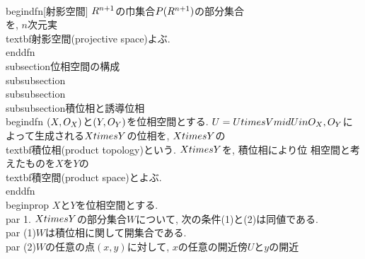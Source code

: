  \\begin{dfn}[射影空間]
 $\\R^{n+1}$の巾集合$P(\\R^{n+1})$の部分集合
 \\[
  \\P^{n}=\\left\\{L\\in P(\\R^{n+1})\\mid L\\text{は}\\R^{n+1}\\text{の1次元部分
 空間}\\right\\}
 \\]
 を, $n$次元実\\textbf{射影空間}(projective space)よぶ.
 \\end{dfn}
\\subsection{位相空間の構成}
\\subsubsection{}
\\subsubsection{}
\\subsubsection{積位相と誘導位相}
\\begin{dfn}
 $(X,\\O_{X})$と$(Y, \\O_{Y})$を位相空間とする. $\\U=\\{U\\times V\\mid U\\in
 \\O_{X}, \\O_{Y}\\}$によって生成される$X\\times Y$の位相を, $X\\times Y$の
 \\textbf{積位相}(product topology)という. $X\\times Y$を, 積位相により位
 相空間と考えたものを$X$を$Y$の\\textbf{積空間}(product space)とよぶ.
\\end{dfn}
\\begin{prop}
 $X$と$Y$を位相空間とする.
 \\par 1. $X\\times Y$の部分集合$W$について, 次の条件(1)と(2)は同値である.
 \\par (1)$W$は積位相に関して開集合である.
 \\par (2)$W$の任意の点$(x, y)$に対して, $x$の任意の開近傍$U$と$y$の開近
